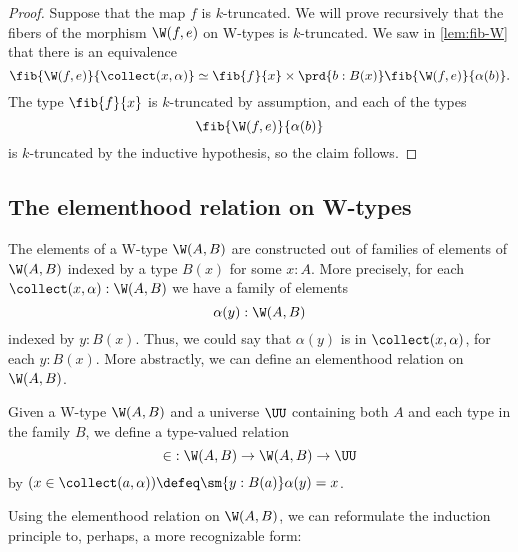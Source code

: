 \begin{proof}
  Suppose that the map $f$ is $k$-truncated. We will prove recursively that the fibers of the morphism $\W(f,e)$ on W-types is $k$-truncated. We saw in \cref{lem:fib-W} that there is an equivalence
  \begin{equation*}
    \fib{\W(f,e)}{\collect(x,\alpha)}\simeq \fib{f}{x}\times\prd{b:B(x)}\fib{\W(f,e)}{\alpha(b)}.
  \end{equation*}
  The type $\fib{f}{x}$ is $k$-truncated by assumption, and each of the types
  \begin{equation*}
    \fib{\W(f,e)}{\alpha(b)}
  \end{equation*}
  is $k$-truncated by the inductive hypothesis, so the claim follows.
\end{proof}


\subsection{The elementhood relation on W-types}

The elements of a W-type $\W(A,B)$ are constructed out of families of elements of $\W(A,B)$ indexed by a type $B(x)$ for some $x:A$. More precisely, for each $\collect(x,\alpha):\W(A,B)$ we have a family of elements
\begin{equation*}
  \alpha(y):\W(A,B)
\end{equation*}
indexed by $y:B(x)$. Thus, we could say that $\alpha(y)$ is in $\collect(x,\alpha)$, for each $y:B(x)$. More abstractly, we can define an elementhood relation on $\W(A,B)$.

\begin{defn}
  Given a W-type $\W(A,B)$ and a universe $\UU$ containing both $A$ and each type in the family $B$, we define a type-valued relation
  \begin{equation*}
    {\in}:\W(A,B)\to\W(A,B)\to \UU
  \end{equation*}
  by $(x\in \collect(a,\alpha))\defeq \sm{y:B(a)}\alpha(y)=x$. 
\end{defn}

Using the elementhood relation on $\W(A,B)$, we can reformulate the induction principle to, perhaps, a more recognizable form:

